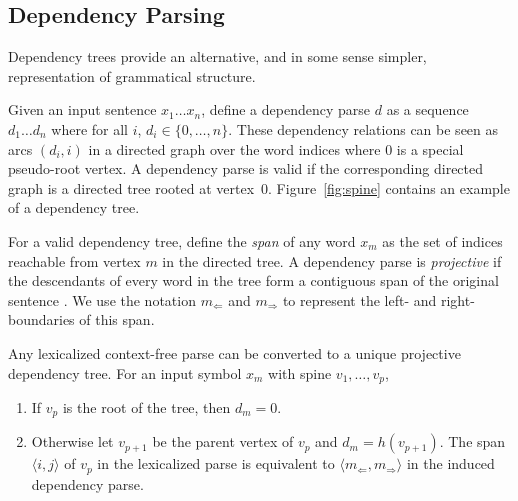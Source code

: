 \documentclass[11pt,letterpaper]{article}
\newcommand{\Left}[1]{#1_{\Leftarrow}}
\newcommand{\Right}[1]{#1_{\Rightarrow}}
\newcommand{\Span}[1]{\langle #1 \rangle}
\begin{document}
\subsection{Dependency Parsing}

Dependency trees provide an alternative, and in some sense simpler,
representation of grammatical structure.


Given an input sentence $x_1
\ldots x_n$, define a dependency parse $d$ as a sequence $d_1 \ldots d_n$ where for all $i$, $d_i \in \{0, \ldots, n\}$. These dependency relations can be seen as arcs $(d_i, i)$ in a directed graph over the word indices where $0$ is a special pseudo-root vertex.  A dependency parse is valid  if the corresponding directed graph is a directed tree rooted at vertex~$0$. Figure~\ref{fig:spine} contains an example of a dependency tree.

For a valid dependency tree, define the \textit{span} of any word $x_m$ as the set of indices reachable from vertex $m$ in the directed tree. A dependency parse is \textit{projective} if the descendants of every word in the tree form a contiguous span of the original sentence \cite{}. We use the notation $\Left{m}$ and $\Right{m}$ to represent the left- and
right-boundaries of this span.









Any lexicalized context-free parse can be converted to a unique projective dependency tree.
For an input symbol $x_m$ with spine $v_1, \ldots, v_p$,

\begin{enumerate}
\item If $v_p$ is the root of the tree,
then $d_m = 0$.
\item Otherwise let $v_{p+1}$ be the parent vertex of
$v_p$ and $d_m = h(v_{p+1})$. The span $\Span{i, j}$ of $v_p$ in the lexicalized parse is equivalent to $\Span{\Left{m}, \Right{m}}$
in the induced dependency parse.
\end{enumerate}
\end{document}
